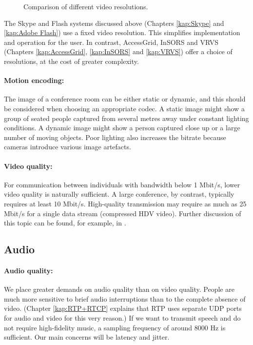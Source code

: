 \begin{figure}
\centering

\caption{Comparison of different video resolutions.}
\label{fig:Resolutions}
\end{figure}

The Skype and Flash systems discussed above (Chapters \ref{kap:Skype} and \ref{kap:Adobe Flash}) use a fixed video resolution. This simplifies implementation and operation for the user. In contrast, AccessGrid, InSORS and VRVS (Chapters \ref{kap:AccessGrid}, \ref{kap:InSORS} and \ref{kap:VRVS}) offer a choice of resolutions, at the cost of greater complexity.

\paragraph*{Motion encoding:}
The image of a conference room can be either static or dynamic, and this should be considered when choosing an appropriate codec. A static image might show a group of seated people captured from several metres away under constant lighting conditions. A dynamic image might show a person captured close up or a large number of moving objects. Poor lighting also increases the bitrate because cameras introduce various image artefacts.

\paragraph*{Video quality:}
For communication between individuals with bandwidth below 1 Mbit/s, lower video quality is naturally sufficient. A large conference, by contrast, typically requires at least 10 Mbit/s. High-quality transmission may require as much as 25 Mbit/s for a single data stream (compressed HDV video). Further discussion of this topic can be found, for example, in \cite{ArticleUVTMU-VideokonferenceSVysokouKvalitou}.

\subsection{Audio}

\paragraph*{Audio quality:}
We place greater demands on audio quality than on video quality. People are much more sensitive to brief audio interruptions than to the complete absence of video. (Chapter \ref{kap:RTP+RTCP} explains that RTP uses separate UDP ports for audio and video for this very reason.) If we want to transmit speech and do not require high-fidelity music, a sampling frequency of around 8000 Hz is sufficient. Our main concerns will be latency and jitter.

